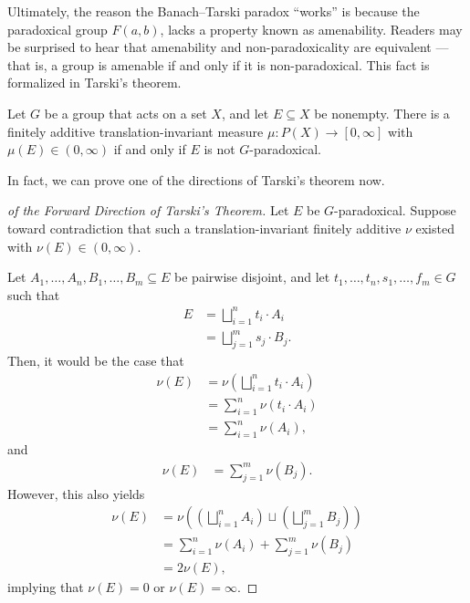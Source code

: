 Ultimately, the reason the Banach--Tarski paradox ``works'' is because the paradoxical group $F(a,b)$, lacks a property known as amenability. Readers may be surprised to hear that amenability and non-paradoxicality are equivalent --- that is, a group is amenable if and only if it is non-paradoxical. This fact is formalized in Tarski's theorem.
\begin{theorem}\label{thm:tarski}
  Let $G$ be a group that acts on a set $X$, and let $E\subseteq X$ be nonempty. There is a finitely additive translation-invariant measure $\mu: P(X)\rightarrow [0,\infty]$ with $\mu(E)\in (0,\infty)$ if and only if $E$ is not $G$-paradoxical.
\end{theorem}
In fact, we can prove one of the directions of Tarski's theorem now.
\begin{proof}[of the Forward Direction of Tarski's Theorem]
  Let $E$ be $G$-paradoxical. Suppose toward contradiction that such a translation-invariant finitely additive $\nu$ existed with $\nu(E) \in (0,\infty)$.

  Let $A_1,\dots,A_n,B_1,\dots,B_m\subseteq E$ be pairwise disjoint, and let $t_1,\dots,t_n,s_1,\dots,f_m\in G$ such that
  \begin{align*}
    E &= \bigsqcup_{i=1}^{n}t_i\cdot A_i\\
      &= \bigsqcup_{j=1}^{m}s_j\cdot B_j.
  \end{align*}
  Then, it would be the case that
  \begin{align*}
    \nu(E) &= \nu\left(\bigsqcup_{i=1}^{n}t_i\cdot A_i\right)\\
           &= \sum_{i=1}^{n}\nu\left(t_i\cdot A_i\right)\\
           &= \sum_{i=1}^{n}\nu\left(A_i\right),
  \end{align*}
  and
  \begin{align*}
    \nu(E) &= \sum_{j=1}^{m}\nu\left(B_j\right).
  \end{align*}
  However, this also yields
  \begin{align*}
    \nu\left(E\right) &= \nu\left(\left(\bigsqcup_{i=1}^{n}A_i\right)\sqcup \left(\bigsqcup_{j=1}^{m}B_j\right)\right)\\
                      &= \sum_{i=1}^{n}\nu\left(A_i\right) + \sum_{j=1}^{m}\nu\left(B_j\right)\\
                      &= 2\nu(E),
  \end{align*}
  implying that $\nu(E) = 0$ or $\nu(E) = \infty$.
\end{proof}

